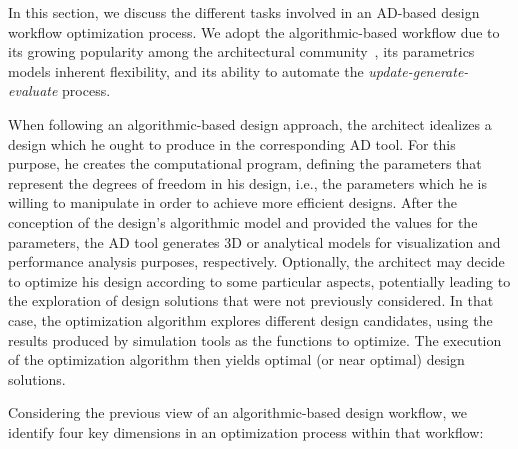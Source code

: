 In this section, we discuss the different tasks involved in an \ac{AD}-based design workflow optimization process. We adopt the algorithmic-based workflow due to its growing popularity among the architectural community~\cite{Kestelier2013}, its parametrics models inherent flexibility, and its ability to automate the \textit{update-generate-evaluate} process. 

	When following an algorithmic-based design approach, the architect idealizes a design which he ought to produce in the corresponding \ac{AD} tool. For this purpose, he creates the computational program, defining the parameters that represent the degrees of freedom in his design, i.e., the parameters which he is willing to manipulate in order to achieve more efficient designs. After the conception of the design's algorithmic model and provided the values for the parameters, the \ac{AD} tool generates 3D or analytical models for visualization and performance analysis purposes, respectively. Optionally, the architect may decide to optimize his design according to some particular aspects, potentially leading to the exploration of design solutions that were not previously considered. In that case, the optimization algorithm explores different design candidates, using the results produced by simulation tools as the functions to optimize. The execution of the optimization algorithm then yields optimal (or near optimal) design solutions.
	
	Considering the previous view of an algorithmic-based design workflow, we identify four key dimensions in an optimization process within that workflow:
	
